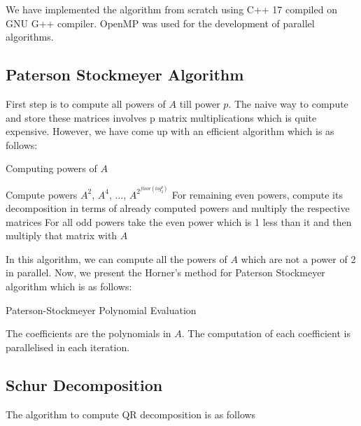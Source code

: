 \documentclass[12pt,a4paper]{article}
\begin{document}
We have implemented the algorithm from scratch using C++ 17 compiled on GNU G++ compiler. OpenMP was used for the development of parallel algorithms. 



\subsection{Paterson Stockmeyer Algorithm}
First step is to compute all powers of $A$ till power $p$. The naive way to compute and store these matrices involves p matrix multiplications which is quite expensive. However, we have come up with an efficient algorithm which is as follows:

\begin{algorithm}
\caption{Computing powers of $A$}\label{alg:cap}
\begin{algorithmic}[1]
\State Compute powers $A^{2}$, $A^{4}$, ..., $A^{2^{floor({log_{2}^{p}})}}$
\State For remaining even powers, compute its decomposition in terms of already computed powers and multiply the respective matrices
\State For all odd powers take the even power which is 1 less than it and then multiply that matrix with $A$
\end{algorithmic}
\end{algorithm}



In this algorithm, we can compute all the powers of $A$ which are not a power of 2 in parallel. Now, we present the Horner's method for Paterson Stockmeyer algorithm which is as follows: 

\begin{algorithm}
\caption{Paterson-Stockmeyer Polynomial Evaluation}\label{euclid}
\begin{algorithmic}[1]
\State Q = 0
\State {}
     \State {Q = {$Q.A^p + Q_p$} \Comment{Horner's Method}
\EndFor
\end{algorithmic}
\end{algorithm}
\newpage
The coefficients are the polynomials in $A$. The computation of each coefficient is parallelised in each iteration. 

\subsection{Schur Decomposition}

The algorithm to compute QR decomposition is as follows
\end{document}
